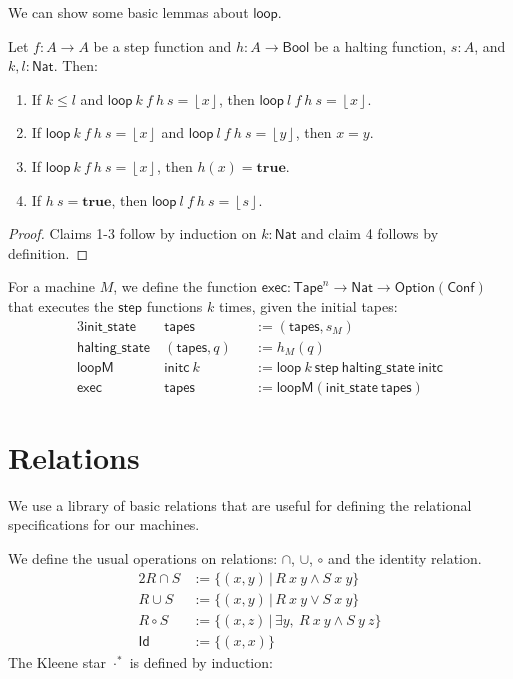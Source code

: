 \documentclass{psartcl}
\newcommand{\MS}[1]{\textsf{#1}}
\newcommand{\setOf}[1]{\bigl \{ #1 \bigr \}}
\newcommand{\setMap}[2]{\setOf{#1 \,\big|\, #2}}
\newcommand{\from}{:}
\renewcommand{\to}{\rightarrow}
\newcommand{\Option}{\MS{Option}}
\newcommand{\Bool}{\MS{Bool}}
\newcommand{\Nat}{\MS{Nat}}
\newcommand{\Some}[1]{\left\lfloor #1\right\rfloor}
\newcommand{\true}{\mathbf{true}}
\newcommand{\Tape}{\MS{Tape}}
\newcommand{\Tapes}[1]{\Tape^{#1}}
\begin{document}
We can show some basic lemmas about $\MS{loop}$.
\begin{lemma}[Simple facts about $\MS{loop}$]
  \label{lem:loop}
  Let $f \from A \to A$ be a step function and $h \from A \to \Bool$ be a halting function, $s:A$, and $k, l:\Nat$.  Then:
  \begin{enumerate}
    \item If $k \le l$ and $\MS{loop}~k~f~h~s = \Some x$, then $\MS{loop}~l~f~h~s = \Some x$.
    \item If $\MS{loop}~k~f~h~s = \Some x$ and $\MS{loop}~l~f~h~s = \Some y$, then $x = y$.
    \item If $\MS{loop}~k~f~h~s = \Some{x}$, then $h(x) = \true$.
    \item If $h~s = \true$, then $\MS{loop}~l~f~h~s = \Some{s}$.
  \end{enumerate}
\end{lemma}
\begin{proof}
  Claims 1-3 follow by induction on $k:\Nat$ and claim 4 follows by definition.
\end{proof}

For a machine $M$, we define the function $\MS{exec} \from \Tapes{n} \to \Nat \to \Option(\MS{Conf})$ that executes the $\MS{step}$ functions $k$ times,
given the initial tapes:
\begin{alignat*}{3}
  \MS{init\_state}   &~\MS{tapes}      &&:= (\MS{tapes}, s_M) \\
  \MS{halting\_state}&~(\MS{tapes}, q) &&:= h_M(q) \\
  \MS{loopM}         &~\MS{initc}~k    &&:= \MS{loop}~k~\MS{step}~\MS{halting\_state}~\MS{initc} \\
  \MS{exec}          &~\MS{tapes}      &&:= \MS{loopM} (\MS{init\_state}~\MS{tapes})
\end{alignat*}


\section{Relations}

We use a library of basic relations that are useful for defining the relational specifications for our machines.

We define the usual operations on relations: $\cap$, $\cup$, $\circ$ and the identity relation.
\begin{alignat*}{2}
  R \cap  S &:= \setMap{(x, y)}{R~x~y \land S~x~y} \\
  R \cup  S &:= \setMap{(x, y)}{R~x~y \lor  S~x~y} \\
  R \circ S &:= \setMap{(x, z)}{\exists y,~ R~x~y \land S~y~z} \\
  \MS{Id}   &:= \setOf{(x, x)}{}
\end{alignat*}
The Kleene star ${\cdot}^*$ is defined by induction:
\end{document}
